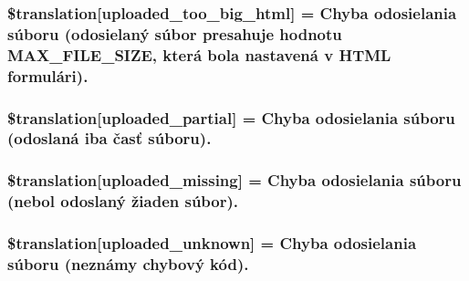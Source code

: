 \subsubsection[{\$translation}]{\setlength{\rightskip}{0pt plus 5cm}\$translation\mbox{[}\textquotesingle{}uploaded\+\_\+too\+\_\+big\+\_\+html\textquotesingle{}\mbox{]} = \textquotesingle{}Chyba odosielania súboru (odosielaný súbor presahuje hodnotu M\+A\+X\+\_\+\+F\+I\+L\+E\+\_\+\+S\+I\+Z\+E, která bola nastavená v H\+T\+M\+L formulári).\textquotesingle{}}\label{class_8upload_8sk___s_k_8php_a623d5b8b92169f57d7e43458aa911cbb}
\hypertarget{class_8upload_8sk___s_k_8php_a967c17da21b0a2d3bd65cca3a9ca0ea8}{}
\subsubsection[{\$translation}]{\setlength{\rightskip}{0pt plus 5cm}\$translation\mbox{[}\textquotesingle{}uploaded\+\_\+partial\textquotesingle{}\mbox{]} = \textquotesingle{}Chyba odosielania súboru (odoslaná iba časť súboru).\textquotesingle{}}\label{class_8upload_8sk___s_k_8php_a967c17da21b0a2d3bd65cca3a9ca0ea8}
\hypertarget{class_8upload_8sk___s_k_8php_a0cce433260be65f1f35853a6b4b8952b}{}
\subsubsection[{\$translation}]{\setlength{\rightskip}{0pt plus 5cm}\$translation\mbox{[}\textquotesingle{}uploaded\+\_\+missing\textquotesingle{}\mbox{]} = \textquotesingle{}Chyba odosielania súboru (nebol odoslaný žiaden súbor).\textquotesingle{}}\label{class_8upload_8sk___s_k_8php_a0cce433260be65f1f35853a6b4b8952b}
\hypertarget{class_8upload_8sk___s_k_8php_a4a9168e922b827e6a28b5db1c00774ca}{}
\subsubsection[{\$translation}]{\setlength{\rightskip}{0pt plus 5cm}\$translation\mbox{[}\textquotesingle{}uploaded\+\_\+unknown\textquotesingle{}\mbox{]} = \textquotesingle{}Chyba odosielania súboru (neznámy chybový kód).\textquotesingle{}}\label{class_8upload_8sk___s_k_8php_a4a9168e922b827e6a28b5db1c00774ca}
\hypertarget{class_8upload_8sk___s_k_8php_a3afc377bd803683314f413a814243066}{}
